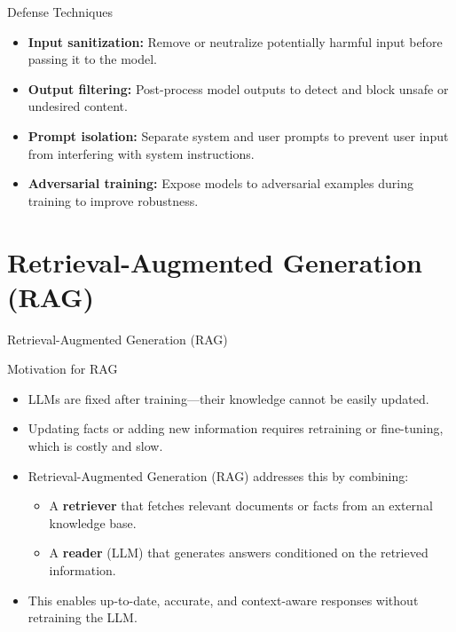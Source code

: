 \begin{frame}{Defense Techniques}
    \begin{itemize}
        \setlength{\itemsep}{1em}
        \item \textbf{Input sanitization:} Remove or neutralize potentially harmful input before passing it to the model.
        \item \textbf{Output filtering:} Post-process model outputs to detect and block unsafe or undesired content.
        \item \textbf{Prompt isolation:} Separate system and user prompts to prevent user input from interfering with system instructions.
        \item \textbf{Adversarial training:} Expose models to adversarial examples during training to improve robustness.
    \end{itemize}
\end{frame}


\section{Retrieval-Augmented Generation (RAG)}
\begin{frame}{}
    \LARGE Retrieval-Augmented Generation (RAG)
\end{frame}


\begin{frame}{Motivation for RAG}
    \begin{itemize}
        \setlength{\itemsep}{1em}
        \item LLMs are fixed after training---their knowledge cannot be easily updated.
        \item Updating facts or adding new information requires retraining or fine-tuning, which is costly and slow.
        \item Retrieval-Augmented Generation (RAG) addresses this by combining:
        \begin{itemize}
            \item A \textbf{retriever} that fetches relevant documents or facts from an external knowledge base.
            \item A \textbf{reader} (LLM) that generates answers conditioned on the retrieved information.
        \end{itemize}
        \item This enables up-to-date, accurate, and context-aware responses without retraining the LLM.
    \end{itemize}
\end{frame}


